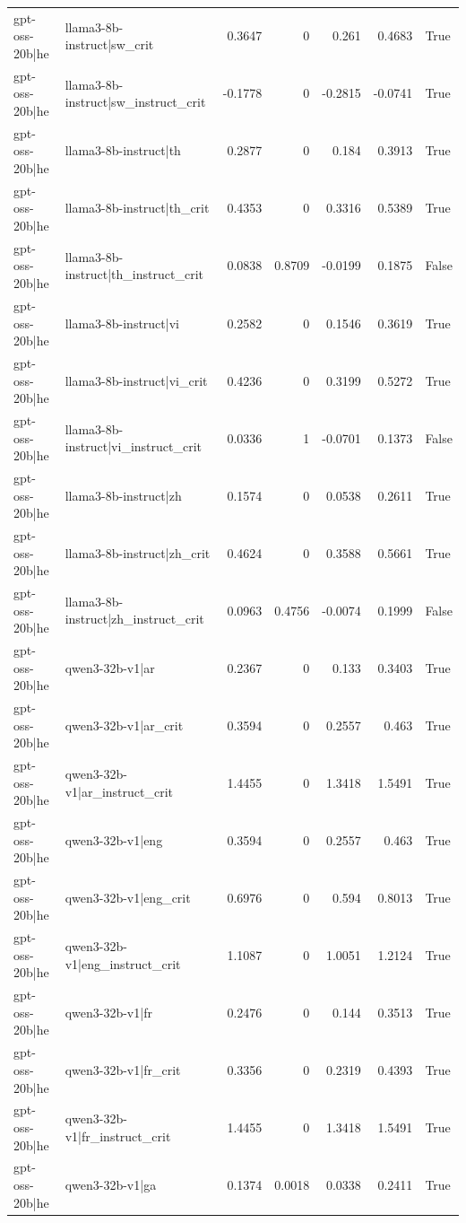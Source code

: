 \begin{table}
\begin{tabular}{l l r r r r l}
gpt-oss-20b|he & llama3-8b-instruct|sw_crit & 0.3647 & 0 & 0.261 & 0.4683 & True \\
gpt-oss-20b|he & llama3-8b-instruct|sw_instruct_crit & -0.1778 & 0 & -0.2815 & -0.0741 & True \\
gpt-oss-20b|he & llama3-8b-instruct|th & 0.2877 & 0 & 0.184 & 0.3913 & True \\
gpt-oss-20b|he & llama3-8b-instruct|th_crit & 0.4353 & 0 & 0.3316 & 0.5389 & True \\
gpt-oss-20b|he & llama3-8b-instruct|th_instruct_crit & 0.0838 & 0.8709 & -0.0199 & 0.1875 & False \\
gpt-oss-20b|he & llama3-8b-instruct|vi & 0.2582 & 0 & 0.1546 & 0.3619 & True \\
gpt-oss-20b|he & llama3-8b-instruct|vi_crit & 0.4236 & 0 & 0.3199 & 0.5272 & True \\
gpt-oss-20b|he & llama3-8b-instruct|vi_instruct_crit & 0.0336 & 1 & -0.0701 & 0.1373 & False \\
gpt-oss-20b|he & llama3-8b-instruct|zh & 0.1574 & 0 & 0.0538 & 0.2611 & True \\
gpt-oss-20b|he & llama3-8b-instruct|zh_crit & 0.4624 & 0 & 0.3588 & 0.5661 & True \\
gpt-oss-20b|he & llama3-8b-instruct|zh_instruct_crit & 0.0963 & 0.4756 & -0.0074 & 0.1999 & False \\
gpt-oss-20b|he & qwen3-32b-v1|ar & 0.2367 & 0 & 0.133 & 0.3403 & True \\
gpt-oss-20b|he & qwen3-32b-v1|ar_crit & 0.3594 & 0 & 0.2557 & 0.463 & True \\
gpt-oss-20b|he & qwen3-32b-v1|ar_instruct_crit & 1.4455 & 0 & 1.3418 & 1.5491 & True \\
gpt-oss-20b|he & qwen3-32b-v1|eng & 0.3594 & 0 & 0.2557 & 0.463 & True \\
gpt-oss-20b|he & qwen3-32b-v1|eng_crit & 0.6976 & 0 & 0.594 & 0.8013 & True \\
gpt-oss-20b|he & qwen3-32b-v1|eng_instruct_crit & 1.1087 & 0 & 1.0051 & 1.2124 & True \\
gpt-oss-20b|he & qwen3-32b-v1|fr & 0.2476 & 0 & 0.144 & 0.3513 & True \\
gpt-oss-20b|he & qwen3-32b-v1|fr_crit & 0.3356 & 0 & 0.2319 & 0.4393 & True \\
gpt-oss-20b|he & qwen3-32b-v1|fr_instruct_crit & 1.4455 & 0 & 1.3418 & 1.5491 & True \\
gpt-oss-20b|he & qwen3-32b-v1|ga & 0.1374 & 0.0018 & 0.0338 & 0.2411 & True \\

\end{tabular}
\end{table}
